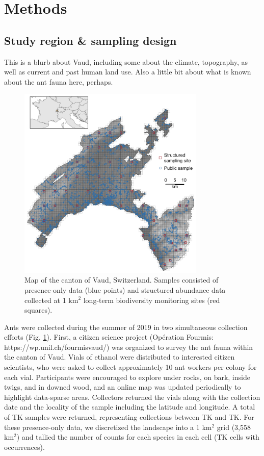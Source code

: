 \documentclass[preprint,review,times,12pt]{elsarticle}
\begin{document}
\section{Methods}
\label{S:2}
\subsection{Study region \& sampling design}
This is a blurb about Vaud, including some about the climate, topography, as well as current and past human land use. Also a little bit about what is known about the ant fauna here, perhaps.


\begin{figure}
	\centering\includegraphics[width=3.5in]{ms/1_Ecography/1/figs/map_VD+inset.png}
	\caption{\label{fig:VD_map} Map of the canton of Vaud, Switzerland. Samples consisted of presence-only data (blue points) and structured abundance data collected at 1 km$^2$ long-term biodiversity monitoring sites (red squares). }
\end{figure}

Ants were collected during the summer of 2019 in two simultaneous collection efforts (Fig. \ref{fig:VD_map}). First, a citizen science project (Opération Fourmis: https://wp.unil.ch/fourmisvaud/) was organized to survey the ant fauna within the canton of Vaud. Vials of ethanol were distributed to interested citizen scientists, who were asked to collect approximately 10 ant workers per colony for each vial. Participants were encouraged to explore under rocks, on bark, inside twigs, and in downed wood, and an online map was updated periodically to highlight data-sparse areas. Collectors returned the vials along with the collection date and the locality of the sample including the latitude and longitude. A total of TK samples were returned, representing collections between TK and TK. For these presence-only data, we discretized the landscape into a 1 km$^2$ grid (3,558 km$^2$) and tallied the number of counts for each species in each cell (TK cells with occurrences). 
\end{document}
